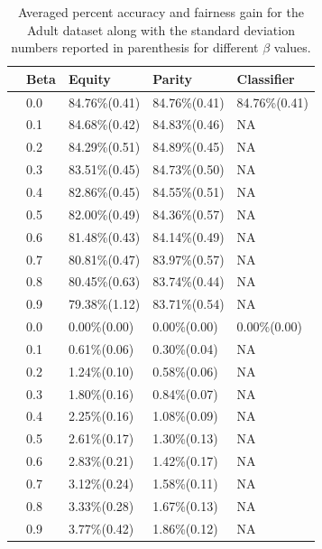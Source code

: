 \begin{table}[h]
\begin{tabular}{ c p{0.5cm} p{1.8cm} p{1.8cm} p{1.7cm}}
 \toprule
& \textbf{Beta} & \textbf{Equity} &\textbf{Parity}&\textbf{Classifier}\\
 \midrule
 \parbox[t]{2mm}{} & 
 0.0&84.76\%(0.41)& 84.76\%(0.41)&84.76\%(0.41)\\[1pt]
   &0.1&84.68\%(0.42)& 84.83\%(0.46)&NA\\[1pt]
   &0.2&84.29\%(0.51)&84.89\%(0.45) &NA\\[1pt]
   &0.3&83.51\%(0.45)& 84.73\%(0.50)&NA\\[1pt]
   &0.4&82.86\%(0.45)&84.55\%(0.51) &NA\\[1pt]
 & 0.5&82.00\%(0.49)& 84.36\%(0.57)&NA\\[1pt]
 &0.6&81.48\%(0.43)& 84.14\%(0.49)&NA\\[1pt]
 &0.7&80.81\%(0.47)&83.97\%(0.57) &NA\\[1pt]
 &0.8&80.45\%(0.63)& 83.74\%(0.44)&NA\\[1pt]
  &0.9&79.38\%(1.12)& 83.71\%(0.54)&NA\\[1pt]
 \bottomrule
 \parbox[t]{2mm}{} & 
   0.0&0.00\%(0.00)& 0.00\%(0.00)&0.00\%(0.00)\\[1pt]
   &0.1&0.61\%(0.06)& 0.30\%(0.04)&NA\\[1pt]
   &0.2&1.24\%(0.10)& 0.58\%(0.06)&NA\\[1pt]
   &0.3&1.80\%(0.16)& 0.84\%(0.07)&NA\\[1pt]
   &0.4&2.25\%(0.16)& 1.08\%(0.09)&NA\\[1pt]
 & 0.5&2.61\%(0.17)& 1.30\%(0.13)&NA\\[1pt]
 &0.6&2.83\%(0.21)& 1.42\%(0.17)&NA\\[1pt]
 &0.7&3.12\%(0.24)& 1.58\%(0.11)&NA\\[1pt]
 &0.8&3.33\%(0.28)& 1.67\%(0.13)&NA\\[1pt]
  &0.9&3.77\%(0.42)&1.86\%(0.12) &NA\\[1pt]
  \bottomrule
\end{tabular}
\caption{Averaged percent accuracy and fairness gain for the Adult dataset along with the standard deviation numbers reported in parenthesis for different $\beta$ values.}
\label{Adult_acc_gain}
\end{table}


